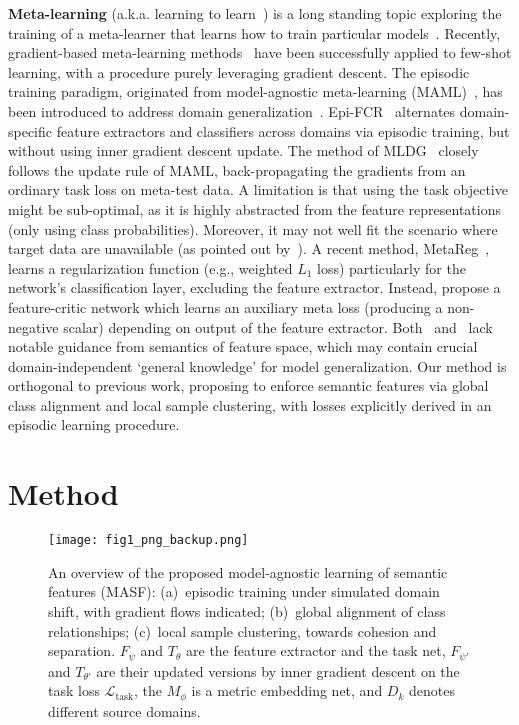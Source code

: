\documentclass{article}
\newcommand{\TaskLoss}{\mathcal{L}_\mathrm{task}}
\begin{document}
\textbf{Meta-learning} (a.k.a. learning to learn~\citep{schmidhuber1987evolutionary,Thrun:1998:LL:296635}) is a long standing topic exploring the training of a meta-learner that learns how to train particular models~\citep{finn2017model,li2016learning,nichol2018first,ravi2016optimization}. 
Recently, gradient-based meta-learning methods~\citep{finn2017model,nichol2018first} have been successfully applied to few-shot learning, with a procedure purely leveraging gradient descent.
The episodic training paradigm, originated from model-agnostic meta-learning (MAML)~\citep{finn2017model}, has been introduced to address domain generalization~\citep{balaji2018metareg,li2018learning,li2019episodic,li2019feature}.
Epi-FCR~\citep{li2019episodic} alternates domain-specific feature extractors and classifiers across domains via episodic training, but without using inner gradient descent update.
The method of MLDG~\citep{li2018learning} closely follows the update rule of MAML, 
back-propagating the gradients from an ordinary task loss on meta-test data.
A limitation is that using the task objective might be sub-optimal, as it is highly abstracted from the feature representations (only using class probabilities). Moreover, it may not well fit the scenario where target data are unavailable (as pointed out by~\citet{balaji2018metareg}).
A recent method, MetaReg~\citep{balaji2018metareg}, learns a regularization function (e.g., weighted $L_1$ loss) particularly for the network's classification layer, excluding the feature extractor. Instead, \citet{li2019feature} propose a feature-critic network which learns an auxiliary meta loss (producing a non-negative scalar) depending on output of the feature extractor. Both~\citep{balaji2018metareg} and~\citep{li2019feature} lack notable guidance from semantics of feature space, which may contain crucial domain-independent `general knowledge' for model generalization.
Our method is orthogonal to previous work,
proposing to enforce semantic features via
global class alignment and local sample clustering, 
with losses explicitly derived in an episodic learning procedure. 

 
\section{Method}


\begin{figure}[t]
    \centering
    \def\svgwidth{\textwidth}
\texttt{[image: fig1\_png\_backup.png]}
     \vspace{-1mm}
    \caption{An overview of the proposed model-agnostic learning of semantic features (MASF): (a)~episodic training under simulated domain shift, with gradient flows indicated; (b)~global alignment of class relationships; (c)~local sample clustering, towards cohesion and separation. $F_\psi$ and $T_\theta$ are the feature extractor and the task net, $F_{\psi'}$ and $T_{\theta'}$ are their updated versions by inner gradient descent on the task loss $\TaskLoss$, the $M_\phi$ is a metric embedding net, and $D_k$ denotes different source domains.}
    \label{fig:overview}
    \vspace{-2mm}
\end{figure}
\end{document}
